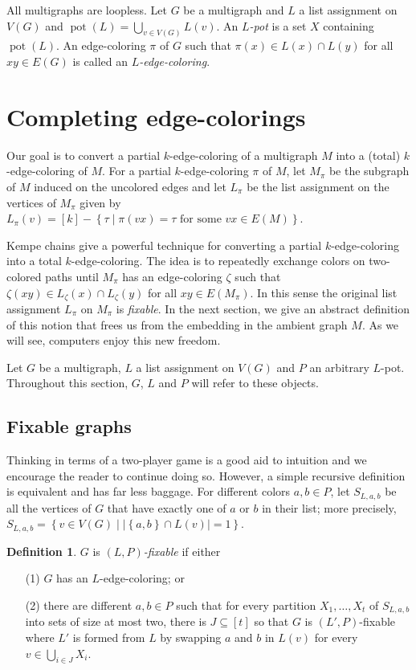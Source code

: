 \documentclass[12pt]{article}
\theoremstyle{plain}
\theoremstyle{definition}
\newtheorem{defn}{Definition}
\theoremstyle{remark}
\newcommand{\set}[1]{\left\{ #1 \right\}}
\newcommand{\setb}[3]{\left\{ #1 \in #2 \mid #3 \right\}}
\newcommand{\setbs}[2]{\left\{ #1 \mid #2 \right\}}
\newcommand{\card}[1]{\left|#1\right|}
\newcommand{\irange}[1]{\left[#1\right]}
\newcommand{\pot}{\operatorname{pot}}
\begin{document}
All multigraphs are loopless.  Let $G$ be a multigraph and $L$ a list assignment on $V(G)$ and $\pot(L) = \bigcup_{v\in V(G)} L(v)$. An \emph{$L$-pot} is a set $X$ containing $\pot(L)$. 
An edge-coloring $\pi$ of $G$ such that $\pi(x) \in L(x) \cap L(y)$ for all $xy \in E(G)$ is called an \emph{$L$-edge-coloring}.

\section{Completing edge-colorings}
Our goal is to convert a partial $k$-edge-coloring of a multigraph $M$ into a (total) $k$-edge-coloring of $M$.  For a partial $k$-edge-coloring $\pi$ of $M$, let $M_\pi$ be the subgraph of $M$ induced on the uncolored edges and let $L_\pi$ be the list assignment on the vertices of $M_\pi$ given by 
$L_\pi(v) = \irange{k} - \setbs{\tau}{\pi(vx) = \tau \text{ for some  } vx \in E(M)}$. 

Kempe chains give a powerful technique for converting a partial $k$-edge-coloring into a total $k$-edge-coloring.  The idea is to repeatedly exchange colors on two-colored paths until $M_\pi$ has an edge-coloring $\zeta$ such that $\zeta(xy) \in L_\zeta(x) \cap L_\zeta(y)$ for all $xy \in E(M_\pi)$.  In this sense the original list assignment $L_\pi$ on $M_\pi$ is \emph{fixable}. In the next section, we give an abstract definition of this notion that frees us from the embedding in the ambient graph $M$.  As we will see, computers enjoy this new freedom.

Let $G$ be a multigraph, $L$ a list assignment on $V(G)$ and $P$ an arbitrary $L$-pot.  Throughout this section, $G$, $L$ and $P$ will refer to these objects.

\subsection{Fixable graphs}
Thinking in terms of a two-player game is a good aid to intuition and we encourage the reader to continue doing so. However, a simple recursive definition is equivalent and has far less baggage. For different colors $a,b \in P$, let $S_{L,a,b}$ be all the vertices of $G$ that have exactly one of $a$ or $b$ in their list; more precisely, $S_{L,a,b} = \setb{v}{V(G)}{\card{\set{a,b} \cap L(v)} = 1}$.  

\begin{defn}
$G$ is \emph{$(L, P)$-fixable} if either
\begin{enumerate}
\item[(1)] $G$ has an $L$-edge-coloring; or
\item[(2)] there are different $a,b \in P$ such that for every partition $X_1, \ldots, X_t$ of $S_{L,a,b}$ into sets of size at most two, 
      there is $J \subseteq \irange{t}$ so that $G$ is $(L', P)$-fixable where $L'$ is formed from $L$ by swapping $a$ and $b$ in $L(v)$ for every $v \in \bigcup_{i \in J} X_i$.
\end{enumerate}
\end{defn}
\end{document}

